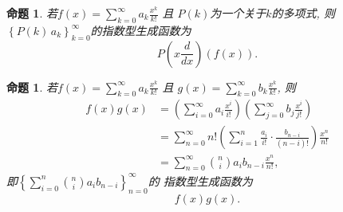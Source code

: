 \documentclass[punct]{ctexbeamer}
\newtheorem{prop}[thm]{命题}
\begin{document}
\begin{frame}
	\begin{prop}
		若$f(x)=\sum_{k=0}^{\infty} a_{k} \frac{x^{k}}{k !}$ 且 $P(k)$为一个关于$k$的多项式, 则
		$\left\{P(k)\, a_{k}\right\}_{k=0}^{\infty}$的指数型生成函数为$$P\left(x \frac{d}{d x}\right) \left(f(x) \right).$$
	\end{prop}
\begin{prop}
	若$f(x)=\sum_{k=0}^{\infty} a_{k} \frac{x^{k}}{k !}$ 且 $g(x)=\sum_{k=0}^{\infty} b_{k} \frac{x^{k}}{k !}$, 则
	\begin{align*}
	f(x) g(x)& =\left(\sum_{i=0}^{\infty} a_{i} \frac{x^{i}}{i !}\right)\left(\sum_{j=0}^{\infty} b_{j} \frac{x^{i}}{j !}\right)\\
& =\sum_{n=0}^{\infty} n !\left(\sum_{i=1}^{n} \frac{a_{i}}{i !} \cdot \frac{b_{n-i}}{(n-i) !}\right) \frac{x^{n}}{n !}\\
&=\sum_{n=0}^{\infty}\binom{n}{i} a_{i} b_{n-i} \frac{x^{n}}{n !},
    \end{align*}
即$\left\{ \sum_{i=0}^{n}\binom{n}{i} a_{i}b_{n-i} \right\}_{n=0}^{\infty}$的
	指数型生成函数为$$f(x)g(x).$$
\end{prop}
\end{frame}

%
%
\end{document}
